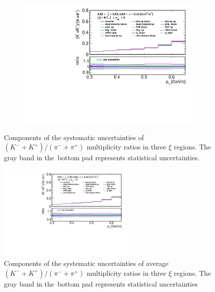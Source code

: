 \begin{figure}[h!]
\begin{subfigure}{.49\textwidth}
		\includegraphics[width=\textwidth,page=3]{chapters/chrgSTAR/img/syst/outPID_Kpi.pdf}
	\end{subfigure}
	\begin{minipage}{.49\textwidth}
		\caption{Components of the systematic uncertainties of $\left(K^-+K^+\right)/\left(\pi^-+\pi^+\right)$ multiplicity ratios  in three $\xi$ regions. The gray band in the~bottom pad represents statistical uncertainties.}
		\label{fig:results_star_syst_Kpi}
	\end{minipage}
\end{figure}

\begin{figure}[h!]
	\centering
		\includegraphics[width=0.59\textwidth,page=5]{chapters/chrgSTAR/img/syst/outPID_Kpi.pdf}
	\caption{Components of the systematic uncertainties of average $\left(K^-+K^+\right)/\left(\pi^-+\pi^+\right)$ multiplicity ratios  in three $\xi$ regions. The gray band in the~bottom pad represents statistical uncertainties}
	\label{fig:results_star_syst_xi_part_Kpi}
\end{figure}

